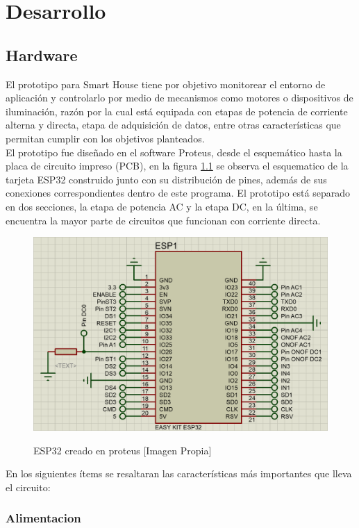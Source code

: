 \chapter{Desarrollo}

\section{Hardware}\label{sec:hw}

El prototipo para Smart House tiene por objetivo monitorear el entorno de aplicación y controlarlo por medio de mecanismos como motores o dispositivos de iluminación, razón por la cual está equipada con etapas de potencia de corriente alterna y directa, etapa de adquisición de datos, entre otras características que permitan cumplir con los objetivos planteados.\\ 

El prototipo fue diseñado en el software Proteus, desde el esquemático hasta la placa de circuito impreso (PCB), en la figura \ref{fig:esp32} se observa el esquematico de la tarjeta ESP32 construido junto con su distribución de pines, además de sus conexiones correspondientes dentro de este programa. El prototipo está separado en dos secciones, la etapa de potencia AC y la etapa DC, en la última, se encuentra la mayor parte de circuitos que funcionan con corriente directa.\\

\begin{figure}[H]
	\centering
	\caption{ESP32 creado en proteus [Imagen Propia]}
	\includegraphics[width=0.5\linewidth]{Imagenes/ESP32}	
	\label{fig:esp32}
\end{figure}

En los siguientes ítems se resaltaran las características más importantes que lleva el circuito:\\

	\subsection{Alimentacion}
	

